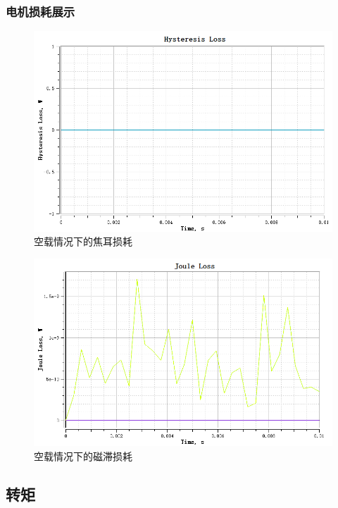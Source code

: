 \documentclass{thuemp}
\begin{document}
\subsubsection{电机损耗展示}
\begin{figure}[H]
  \centering
  \includegraphics[width=1\linewidth]{./img/task1/noload-H-loss.png}
  \caption{空载情况下的焦耳损耗}
\end{figure}

\begin{figure}[H]
  \centering
  \includegraphics[width=1\linewidth]{./img/task1/noload-Joule-Loss.png}
  \caption{空载情况下的磁滞损耗}
\end{figure}

\subsection{转矩}
\end{document}
